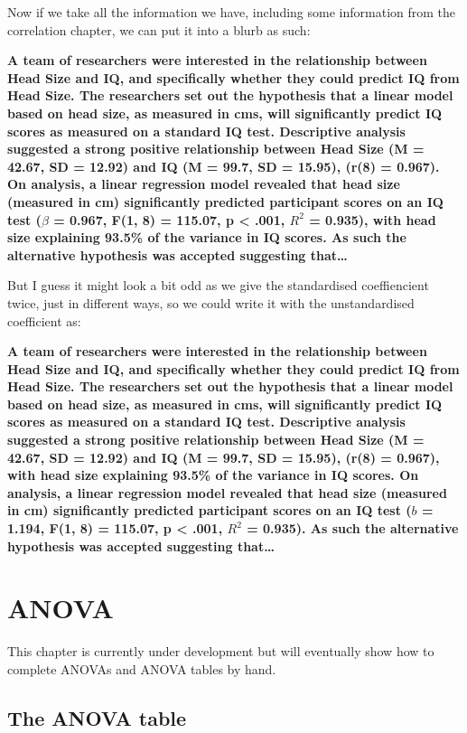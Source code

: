 \documentclass[
  oneside]{book}
\begin{document}
Now if we take all the information we have, including some information from the correlation chapter, we can put it into a blurb as such:

\textbf{A team of researchers were interested in the relationship between Head Size and IQ, and specifically whether they could predict IQ from Head Size. The researchers set out the hypothesis that a linear model based on head size, as measured in cms, will significantly predict IQ scores as measured on a standard IQ test. Descriptive analysis suggested a strong positive relationship between Head Size (M = 42.67, SD = 12.92) and IQ (M = 99.7, SD = 15.95), (r(8) = 0.967). On analysis, a linear regression model revealed that head size (measured in cm) significantly predicted participant scores on an IQ test (\(\beta\) = 0.967, F(1, 8) = 115.07, p \textless{} .001, \(R^2\) = 0.935), with head size explaining 93.5\% of the variance in IQ scores. As such the alternative hypothesis was accepted suggesting that\ldots{}}

But I guess it might look a bit odd as we give the standardised coeffiencient twice, just in different ways, so we could write it with the unstandardised coefficient as:

\textbf{A team of researchers were interested in the relationship between Head Size and IQ, and specifically whether they could predict IQ from Head Size. The researchers set out the hypothesis that a linear model based on head size, as measured in cms, will significantly predict IQ scores as measured on a standard IQ test. Descriptive analysis suggested a strong positive relationship between Head Size (M = 42.67, SD = 12.92) and IQ (M = 99.7, SD = 15.95), (r(8) = 0.967), with head size explaining 93.5\% of the variance in IQ scores. On analysis, a linear regression model revealed that head size (measured in cm) significantly predicted participant scores on an IQ test (\(b\) = 1.194, F(1, 8) = 115.07, p \textless{} .001, \(R^2\) = 0.935). As such the alternative hypothesis was accepted suggesting that\ldots{}}

\hypertarget{anova}{%
\chapter{ANOVA}\label{anova}}

This chapter is currently under development but will eventually show how to complete ANOVAs and ANOVA tables by hand.

\hypertarget{the-anova-table}{%
\section{The ANOVA table}\label{the-anova-table}}
\end{document}
